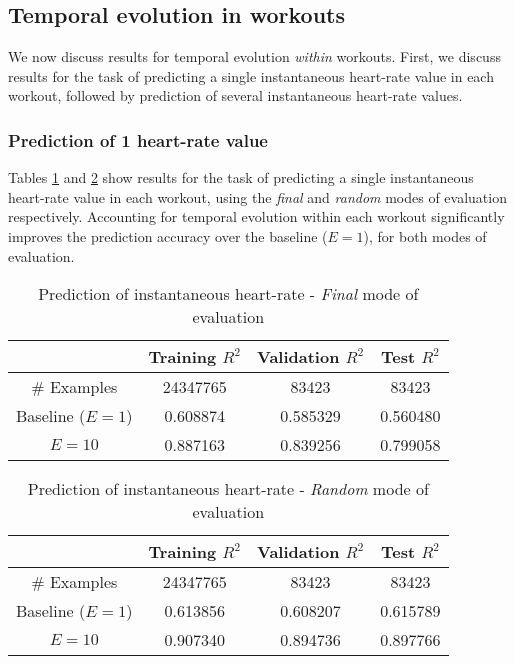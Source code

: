 \documentclass{acm_proc_article-sp}
\begin{document}
\subsection{Temporal evolution in workouts}

We now discuss results for temporal evolution \emph{within} workouts. First, we discuss results for the task of predicting a single instantaneous heart-rate value in each workout, followed by prediction of several instantaneous heart-rate values.

\subsubsection{Prediction of 1 heart-rate value}

Tables \ref{tableInstHrFinal} and \ref{tableInstHrRandom} show results for the task of predicting a single instantaneous heart-rate value in each workout, using the \emph{final} and \emph{random} modes of evaluation respectively. Accounting for temporal evolution within each workout significantly improves the prediction accuracy over the baseline ($E = 1$), for both modes of evaluation.

\begin{table}[h]
\centering
\begin{tabular}{|c|c|c|c|} \hline
& Training $R^2$ & Validation $R^2$ & Test $R^2$ \\ \hline
\# Examples & 24347765 & 83423  & 83423  \\ \hline
Baseline ($E = 1$) & 0.608874 & 0.585329 & 0.560480 \\ \hline
$E = 10$ & 0.887163 & 0.839256 & 0.799058 \\ \hline
\end{tabular}
\caption{Prediction of instantaneous heart-rate - \emph{Final} mode of evaluation }
\label{tableInstHrFinal}
\end{table}

\begin{table}[h]
\centering
\begin{tabular}{|c|c|c|c|} \hline
& Training $R^2$ & Validation $R^2$ & Test $R^2$ \\ \hline
\# Examples & 24347765  & 83423  & 83423  \\ \hline
Baseline ($E = 1$) & 0.613856 & 0.608207 & 0.615789 \\ \hline
$E = 10$ & 0.907340 & 0.894736 & 0.897766 \\ \hline
\end{tabular}
\caption{Prediction of instantaneous heart-rate - \emph{Random} mode of evaluation }
\label{tableInstHrRandom}
\end{table}
\end{document}
